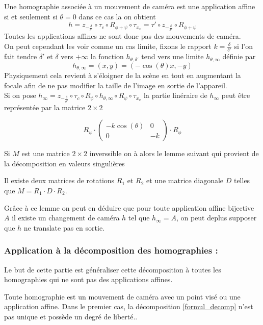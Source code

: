 \begin{Remaffin}
Une homographie associée à un mouvement de caméra est une application affine si et seulement si $\theta=0$ dans ce cas la on obtient  
\begin{equation*}
h=z_{-\frac{\delta}{\delta'}} \circ \tau_c \circ R_{\phi+\psi} \circ \tau_{x_{v}}
=\tau' \circ z_{-\frac{\delta}{\delta'}} \circ  R_{\phi+\psi}
\end{equation*}
Toutes les applications affines ne sont donc pas des mouvements de caméra.\\
On peut cependant les voir comme un cas limite, fixons le rapport  $k=\frac{\delta}{\delta'}$ si l'on fait tendre $\delta'$ et $\delta$ vers $+\infty$ la fonction $h_{\theta,\delta'}$ tend vers une limite $h_{\theta,\infty}$ définie par
\begin{equation*}
h_{\theta,\infty}=(x,y)=(-\cos(\theta)x,-y)
\end{equation*}
Physiquement cela revient à s'éloigner de la scène en tout  en augmentant la focale afin de ne pas modifier la taille de l'image en sortie de l'appareil.\\
Si on pose $h_\infty = z_{-\frac{\delta}{\delta'}} \circ \tau_c \circ R_{\phi} \circ h_{\theta,\infty} \circ R_{\psi} \circ \tau_{x_{v}}$ la partie linéraire de $h_{\infty}$ peut être représentée par la matrice $2\times2$

\begin{equation*}
R_{\psi} \cdot 
\begin{pmatrix}
-k\cos(\theta)&0\\
0&-k
\end{pmatrix}
\cdot R_{\phi}
\end{equation*}

Si  $M$ est une matrice $2\times 2$  inverssible on à alors le lemme suivant qui provient de la décomposition en valeurs singulières \\
\begin{lem}
Il existe deux matrices de rotations $R_1$ et $R_2$  et une matrice diagonale $D$ telles que $M = R_1 \cdot D \cdot R_2$.
\end{lem}
Grâce à ce lemme on peut en déduire que pour toute application affine bijective $A$ il existe un changement de caméra $h$ tel que $h_\infty = A$, on peut deplus supposer que $h$ 
ne translate pas en sortie.
\end{Remaffin}


\subsubsection{Application à la décomposition des homographies :}
Le but de cette partie est généraliser cette décomposition à toutes les homographies qui ne sont pas des applications affines.
\begin{prop}
Toute homographie est un mouvement de caméra avec un point visé ou une application affine. Dans le premier cas, la décomposition \ref{formul_decomp} n'est pas unique et possède un degré de liberté..
\label{thepropdecomp}
\end{prop}
